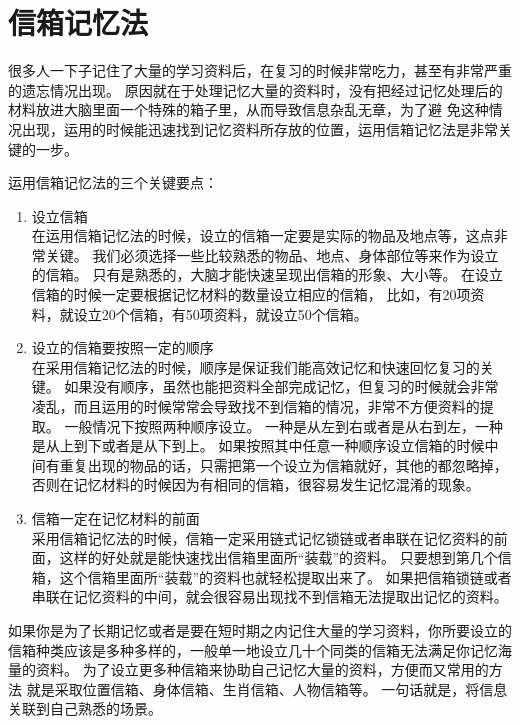 
\chapter{信箱记忆法}

很多人一下子记住了大量的学习资料后，在复习的时候非常吃力，甚至有非常严重的遗忘情况出现。
原因就在于处理记忆大量的资料时，没有把经过记忆处理后的材料放进大脑里面一个特殊的箱子里，从而导致信息杂乱无章，为了避 免这种情况出现，运用的时候能迅速找到记忆资料所存放的位置，运用信箱记忆法是非常关键的一步。

运用信箱记忆法的三个关键要点：
\begin{enumerate}
\item 设立信箱\\
  在运用信箱记忆法的时候，设立的信箱一定要是实际的物品及地点等，这点非常关键。
  我们必须选择一些比较熟悉的物品、地点、身体部位等来作为设立的信箱。
  只有是熟悉的，大脑才能快速呈现出信箱的形象、大小等。
  在设立信箱的时候一定要根据记忆材料的数量设立相应的信箱， 比如，有20项资料，就设立20个信箱，有50项资料，就设立50个信箱。
\item 设立的信箱要按照一定的顺序\\
  在采用信箱记忆法的时候，顺序是保证我们能高效记忆和快速回忆复习的关键。
  如果没有顺序，虽然也能把资料全部完成记忆，但复习的时候就会非常凌乱，而且运用的时候常常会导致找不到信箱的情况，非常不方便资料的提取。
  一般情况下按照两种顺序设立。
  一种是从左到右或者是从右到左，一种是从上到下或者是从下到上。
  如果按照其中任意一种顺序设立信箱的时候中间有重复出现的物品的话，只需把第一个设立为信箱就好，其他的都忽略掉，否则在记忆材料的时候因为有相同的信箱，很容易发生记忆混淆的现象。
\item 信箱一定在记忆材料的前面\\
  采用信箱记忆法的时候，信箱一定采用链式记忆锁链或者串联在记忆资料的前面，这样的好处就是能快速找出信箱里面所“装载”的资料。
  只要想到第几个信箱，这个信箱里面所“装载”的资料也就轻松提取出来了。
  如果把信箱锁链或者串联在记忆资料的中间，就会很容易出现找不到信箱无法提取出记忆的资料。
\end{enumerate}

如果你是为了长期记忆或者是要在短时期之内记住大量的学习资料，你所要设立的信箱种类应该是多种多样的，一般单一地设立几十个同类的信箱无法满足你记忆海量的资料。
为了设立更多种信箱来协助自己记忆大量的资料，方便而又常用的方法 就是采取位置信箱、身体信箱、生肖信箱、人物信箱等。
一句话就是，将信息关联到自己熟悉的场景。





